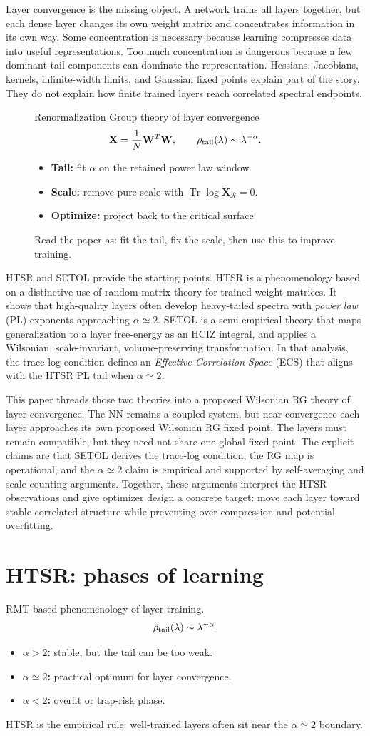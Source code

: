\documentclass[10pt,twocolumn]{article}
\newcommand{\Tr}{\operatorname{Tr}}
\newcommand{\W}{\mathbf W}
\newcommand{\X}{\mathbf X}
\newcommand{\Xtilde}{\widetilde{\mathbf X}}
\newcommand{\Rell}{\mathcal R}
\newcommand{\takeaway}[1]{%
  \par\vspace{4pt}\noindent\textcolor{boxblue}{#1}%
}
\newcommand{\eqtight}[1]{\[\vspace{-1pt}#1\vspace{-3pt}\]}
\newcommand{\IntroRoadmapBox}{%
  \begin{tcolorbox}[marginalbox,title=\textbf{0. Roadmap: tail, scale, and risk}]
    Renormalization Group theory of layer convergence
\eqtight{\X=\frac{1}{N}\W^T\W,\qquad \rho_{\rm tail}(\lambda)\sim \lambda^{-\alpha}.}
\begin{itemize}
\item \textbf{Tail:} fit $\alpha$ on the retained power law window.
\item \textbf{Scale:} remove pure scale with $\Tr\log\Xtilde_{\Rell}=0$.
\item \textbf{Optimize:} project back to the critical surface
\end{itemize}
\takeaway{Read the paper as: fit the tail, fix the scale, then use this to improve training.}
\end{tcolorbox}%
}
\begin{document}
Layer convergence is the missing object. A network trains all layers together, but each dense layer changes its own weight matrix and concentrates information in its own way. Some concentration is necessary because learning compresses data into useful representations. Too much concentration is dangerous because a few dominant tail components can dominate the representation. Hessians, Jacobians, kernels, infinite-width limits, and Gaussian fixed points explain part of the story. They do not explain how finite trained layers reach correlated spectral endpoints.

\begin{figure}[t]
\centering
\IntroRoadmapBox
\end{figure}

HTSR and SETOL provide the starting points. HTSR is a phenomenology based on a distinctive use of random matrix theory for trained weight matrices. It shows that high-quality layers often develop heavy-tailed spectra with \emph{power law} (PL) exponents approaching $\alpha\simeq2$. SETOL is a semi-empirical theory that maps generalization to a layer free-energy as an HCIZ integral, and applies a Wilsonian, scale-invariant, volume-preserving transformation. In that analysis, the trace-log condition defines an \emph{Effective Correlation Space} (ECS) that aligns with the HTSR PL tail when $\alpha\simeq 2$.

This paper threads those two theories into a proposed Wilsonian RG theory of layer convergence. The NN remains a coupled system, but near convergence each layer approaches its own proposed Wilsonian RG fixed point. The layers must remain compatible, but they need not share one global fixed point. The explicit claims are that SETOL derives the trace-log condition, the RG map is operational, and the $\alpha\simeq2$ claim is empirical and supported by self-averaging and scale-counting arguments.
Together, these arguments interpret the HTSR observations and give optimizer design a concrete target: move each layer toward stable correlated structure
while preventing over-compression and potential overfitting.

\section{HTSR: phases of learning}
\label{sxn:htsr}

\begin{tcolorbox}[marginalbox,title=\textbf{1. HTSR heavy-tailed phases}]
  RMT-based phenomenology of layer training.
\eqtight{\rho_{\rm tail}(\lambda)\sim\lambda^{-\alpha}.}
\begin{itemize}
\item \textbf{$\alpha>2$:} stable, but the tail can be too weak.
\item \textbf{$\alpha\simeq2$:} practical optimum for layer convergence.
\item \textbf{$\alpha<2$:} overfit or trap-risk phase.
\end{itemize}
\takeaway{HTSR is the empirical rule: well-trained layers often sit near the $\alpha\simeq2$ boundary.}
\end{tcolorbox}
\end{document}
